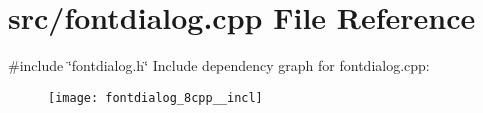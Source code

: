 \section{src/fontdialog.cpp File Reference}
\label{fontdialog_8cpp}
{\ttfamily \#include \char`\"{}fontdialog.\+h\char`\"{}}\newline
Include dependency graph for fontdialog.\+cpp\+:\nopagebreak
\begin{figure}[H]
\begin{center}
\leavevmode
\texttt{[image: fontdialog\_8cpp\_\_incl]}
\end{center}
\end{figure}
